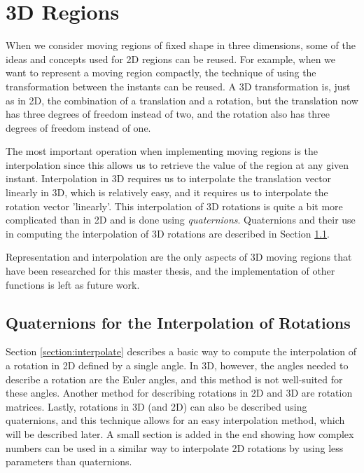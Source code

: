 
\section{3D Regions}
\label{section:3d_regions}

When we consider moving regions of fixed shape in three dimensions, some of the ideas and concepts used for 2D regions can be reused. For example, when we want to represent a moving region compactly, the technique of using the transformation between the instants can be reused. A 3D transformation is, just as in 2D, the combination of a translation and a rotation, but the translation now has three degrees of freedom instead of two, and the rotation also has three degrees of freedom instead of one.

The most important operation when implementing moving regions is the interpolation since this allows us to retrieve the value of the region at any given instant. Interpolation in 3D requires us to interpolate the translation vector linearly in 3D, which is relatively easy, and it requires us to interpolate the rotation vector 'linearly'.  This interpolation of 3D rotations is quite a bit more complicated than in 2D and is done using \textit{quaternions}. Quaternions and their use in computing the interpolation of 3D rotations are described in Section \ref{section:quaternion_interpolation}.

Representation and interpolation are the only aspects of 3D moving regions that have been researched for this master thesis, and the implementation of other functions is left as future work.

\subsection{Quaternions for the Interpolation of Rotations}
\label{section:quaternion_interpolation}

Section \ref{section:interpolate} describes a basic way to compute the interpolation of a rotation in 2D defined by a single angle. In 3D, however, the angles needed to describe a rotation are the Euler angles, and this method is not well-suited for these angles. Another method for describing rotations in 2D and 3D are rotation matrices. Lastly, rotations in 3D (and 2D) can also be described using quaternions, and this technique allows for an easy interpolation method, which will be described later. A small section is added in the end showing how complex numbers can be used in a similar way to interpolate 2D rotations by using less parameters than quaternions.

